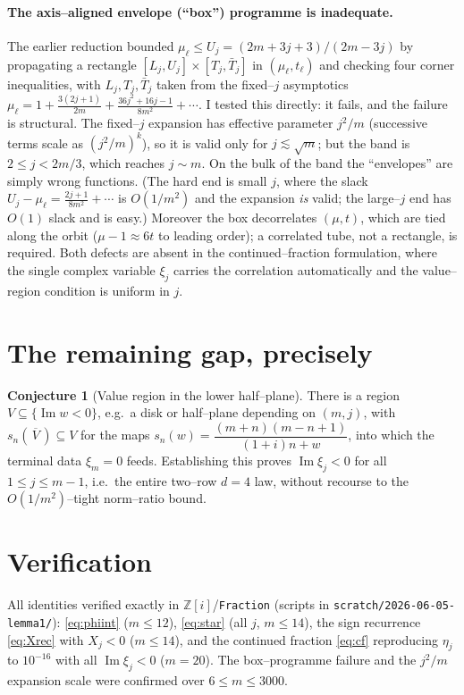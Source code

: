 \documentclass[11pt]{article}
\theoremstyle{definition}
\newtheorem{conjecture}{Conjecture}
\newcommand{\Z}{\mathbb{Z}}
\renewcommand{\Im}{\operatorname{Im}}
\begin{document}
\paragraph{The axis--aligned envelope (``box'') programme is inadequate.} The earlier
reduction bounded $\mu_\ell\le U_j=(2m+3j+3)/(2m-3j)$ by propagating a rectangle
$[L_j,U_j]\times[T_j,\bar T_j]$ in $(\mu_\ell,t_\ell)$ and checking four corner inequalities,
with $L_j,T_j,\bar T_j$ taken from the fixed--$j$ asymptotics
$\mu_\ell=1+\tfrac{3(2j+1)}{2m}+\tfrac{36j^2+16j-1}{8m^2}+\cdots$. I tested this directly:
it fails, and the failure is structural. The fixed--$j$ expansion has effective parameter
$j^2/m$ (successive terms scale as $(j^2/m)^k$), so it is valid only for $j\lesssim\sqrt m$;
but the band is $2\le j<2m/3$, which reaches $j\sim m$. On the bulk of the band the
``envelopes'' are simply wrong functions. (The hard end is small $j$, where the slack
$U_j-\mu_\ell=\tfrac{2j+1}{8m^2}+\cdots$ is $O(1/m^2)$ and the expansion \emph{is} valid;
the large--$j$ end has $O(1)$ slack and is easy.) Moreover the box decorrelates $(\mu,t)$,
which are tied along the orbit ($\mu-1\approx 6t$ to leading order); a correlated tube, not a
rectangle, is required. Both defects are absent in the continued--fraction formulation, where
the single complex variable $\xi_j$ carries the correlation automatically and the
value--region condition is uniform in $j$.

\section{The remaining gap, precisely}
\begin{conjecture}[Value region in the lower half--plane]
There is a region $V\subseteq\{\Im w<0\}$, e.g.\ a disk or half--plane depending on $(m,j)$,
with $s_n(\,\overline V\,)\subseteq V$ for the maps $s_n(w)=\dfrac{(m+n)(m-n+1)}{(1+i)n+w}$,
into which the terminal data $\xi_m=0$ feeds. Establishing this proves $\Im\xi_j<0$ for all
$1\le j\le m-1$, i.e.\ the entire two--row $d{=}4$ law, without recourse to the
$O(1/m^2)$--tight norm--ratio bound.
\end{conjecture}

\section{Verification}
All identities verified exactly in $\Z[i]$/\texttt{Fraction} (scripts in
\texttt{scratch/2026-06-05-lemma1/}): \eqref{eq:phiint} ($m\le12$), \eqref{eq:star} (all
$j$, $m\le14$), the sign recurrence \eqref{eq:Xrec} with $X_j<0$ ($m\le14$), and the
continued fraction \eqref{eq:cf} reproducing $\eta_j$ to $10^{-16}$ with all $\Im\xi_j<0$
($m=20$). The box--programme failure and the $j^2/m$ expansion scale were confirmed over
$6\le m\le 3000$.
\end{document}
